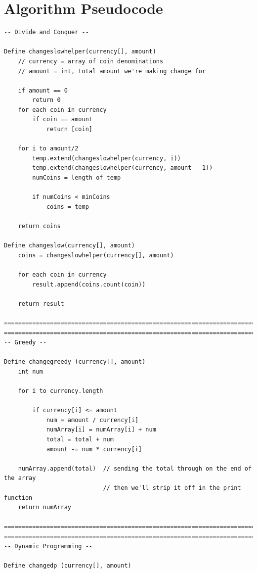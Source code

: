\documentclass[11pt,letterpaper]{article}
\begin{document}
\section*{Algorithm Pseudocode}
\begin{verbatim}
-- Divide and Conquer --

Define changeslowhelper(currency[], amount)
    // currency = array of coin denominations
    // amount = int, total amount we're making change for
    
    if amount == 0
        return 0
    for each coin in currency
        if coin == amount
            return [coin]
			
    for i to amount/2
        temp.extend(changeslowhelper(currency, i))
        temp.extend(changeslowhelper(currency, amount - 1))
        numCoins = length of temp
		
        if numCoins < minCoins
            coins = temp
	
    return coins
	
Define changeslow(currency[], amount)
    coins = changeslowhelper(currency[], amount)
	
    for each coin in currency
        result.append(coins.count(coin))
	
    return result
	
===================================================================================
===================================================================================
-- Greedy --

Define changegreedy (currency[], amount)
    int num
	
    for i to currency.length
		
        if currency[i] <= amount
            num = amount / currency[i]
            numArray[i] = numArray[i] + num
            total = total + num
            amount -= num * currency[i]
	
    numArray.append(total)  // sending the total through on the end of the array
                            // then we'll strip it off in the print function
    return numArray
    
===================================================================================
===================================================================================
-- Dynamic Programming --

Define changedp (currency[], amount)


\end{verbatim}
\end{document}
